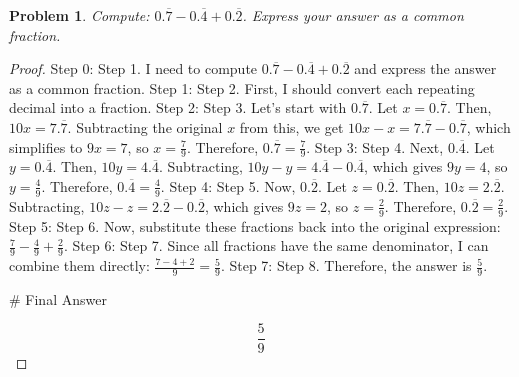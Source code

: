 \documentclass{article}
\newtheorem{theorem}{Problem}
\begin{document}
\begin{theorem}
Compute: $0.\overline{7}-0.\overline{4}+0.\overline{2}$. Express your answer as a common fraction.
\end{theorem}

\begin{proof}
Step 0: Step 1. I need to compute \( 0.\overline{7} - 0.\overline{4} + 0.\overline{2} \) and express the answer as a common fraction.
Step 1: Step 2. First, I should convert each repeating decimal into a fraction.
Step 2: Step 3. Let's start with \( 0.\overline{7} \). Let \( x = 0.\overline{7} \). Then, \( 10x = 7.\overline{7} \). Subtracting the original \( x \) from this, we get \( 10x - x = 7.\overline{7} - 0.\overline{7} \), which simplifies to \( 9x = 7 \), so \( x = \frac{7}{9} \). Therefore, \( 0.\overline{7} = \frac{7}{9} \).
Step 3: Step 4. Next, \( 0.\overline{4} \). Let \( y = 0.\overline{4} \). Then, \( 10y = 4.\overline{4} \). Subtracting, \( 10y - y = 4.\overline{4} - 0.\overline{4} \), which gives \( 9y = 4 \), so \( y = \frac{4}{9} \). Therefore, \( 0.\overline{4} = \frac{4}{9} \).
Step 4: Step 5. Now, \( 0.\overline{2} \). Let \( z = 0.\overline{2} \). Then, \( 10z = 2.\overline{2} \). Subtracting, \( 10z - z = 2.\overline{2} - 0.\overline{2} \), which gives \( 9z = 2 \), so \( z = \frac{2}{9} \). Therefore, \( 0.\overline{2} = \frac{2}{9} \).
Step 5: Step 6. Now, substitute these fractions back into the original expression: \( \frac{7}{9} - \frac{4}{9} + \frac{2}{9} \).
Step 6: Step 7. Since all fractions have the same denominator, I can combine them directly: \( \frac{7 - 4 + 2}{9} = \frac{5}{9} \).
Step 7: Step 8. Therefore, the answer is \( \frac{5}{9} \).

# Final Answer

\[ \boxed{\dfrac{5}{9}} \]
\end{proof}
\end{document}
